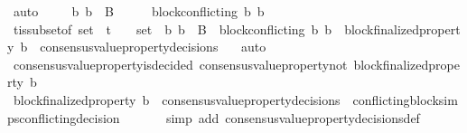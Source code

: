 \begin{isabellebody}
\ auto\isanewline
\ \ \ \isamarkupfalse%
\ {\isachardoublequoteopen}{\isacharbraceleft}b{}{\isacharcomma}\ b{}{\isacharbraceright}\ {\isasymsubseteq}\ B\ {\isasymand}\ {\isasymsigma}\ {\isasymin}\ {\isasymSigma}\ {\isasymand}\ block{\isacharunderscore}conflicting\ {\isacharparenleft}b{}{\isacharcomma}\ b{}{\isacharparenright}{\isachardoublequoteclose}\isanewline
\ \ \ \ \ \isamarkupfalse%
\ {\isasymSigma}t{\isacharunderscore}is{\isacharunderscore}subset{\isacharunderscore}of{\isacharunderscore}{\isasymSigma}\ {\isacartoucheopen}{\isasymsigma}{\isacharunderscore}set\ {\isasymsubseteq}\ {\isasymSigma}t{\isacartoucheclose}\ {\isacartoucheopen}{\isacharbraceleft}{\isasymsigma}{\isacharcomma}\ {\isasymsigma}{\isacharprime}{\isacharbraceright}\ {\isasymsubseteq}\ {\isasymsigma}{\isacharunderscore}set\ {\isasymand}\ {\isacharbraceleft}b{}{\isacharcomma}\ b{}{\isacharbraceright}\ {\isasymsubseteq}\ B\ {\isasymand}\ block{\isacharunderscore}conflicting\ {\isacharparenleft}b{}{\isacharcomma}\ b{}{\isacharparenright}\ {\isasymand}\ block{\isacharunderscore}finalized{\isacharunderscore}property\ b{}\ {\isasymin}\ consensus{\isacharunderscore}value{\isacharunderscore}property{\isacharunderscore}decisions\ {\isasymsigma}{\isacartoucheclose}\ \isamarkupfalse%
\ auto\isanewline
\ \ \ \isamarkupfalse%
\ {\isachardoublequoteopen}consensus{\isacharunderscore}value{\isacharunderscore}property{\isacharunderscore}is{\isacharunderscore}decided\ {\isacharparenleft}consensus{\isacharunderscore}value{\isacharunderscore}property{\isacharunderscore}not\ {\isacharparenleft}block{\isacharunderscore}finalized{\isacharunderscore}property\ b{}{\isacharparenright}{\isacharcomma}\ {\isasymsigma}{\isacharprime}{\isacharparenright}{\isachardoublequoteclose}\isanewline
\ \ \ \ \ \isamarkupfalse%
\ {\isacartoucheopen}block{\isacharunderscore}finalized{\isacharunderscore}property\ b{}\ {\isasymin}\ consensus{\isacharunderscore}value{\isacharunderscore}property{\isacharunderscore}decisions\ {\isasymsigma}{\isacharprime}{\isacartoucheclose}\ conflicting{\isacharunderscore}blocks{\isacharunderscore}imps{\isacharunderscore}conflicting{\isacharunderscore}decision\isanewline
\ \ \ \ \ \isamarkupfalse%
\ {\isacharparenleft}simp\ add{\isacharcolon}\ consensus{\isacharunderscore}value{\isacharunderscore}property{\isacharunderscore}decisions{\isacharunderscore}def{\isacharparenright}\isanewline

\end{isabellebody}

